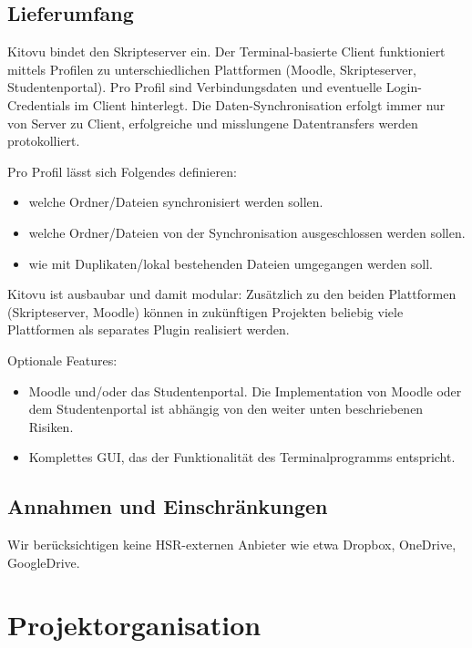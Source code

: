 \documentclass[a4paper]{article}
\begin{document}
\subsection{Lieferumfang}
Kitovu bindet den Skripteserver ein. Der Terminal-basierte Client funktioniert mittels Profilen zu unterschiedlichen Plattformen (Moodle, Skripteserver, Studentenportal). Pro Profil sind Verbindungsdaten und eventuelle Login-Credentials im Client hinterlegt. Die Daten-Synchronisation erfolgt immer nur von Server zu Client, erfolgreiche und misslungene Datentransfers werden protokolliert.

Pro Profil lässt sich Folgendes definieren:

\begin{itemize}
\item welche Ordner/Dateien synchronisiert werden sollen.
\item welche Ordner/Dateien von der Synchronisation ausgeschlossen werden sollen.
\item wie mit Duplikaten/lokal bestehenden Dateien umgegangen werden soll.
\end{itemize}

Kitovu ist ausbaubar und damit modular: Zusätzlich zu den beiden Plattformen (Skripteserver, Moodle) können in zukünftigen Projekten beliebig viele Plattformen als separates Plugin realisiert werden.

Optionale Features:

\begin{itemize}
\item Moodle und/oder das Studentenportal. Die Implementation von Moodle oder dem Studentenportal ist abhängig von den weiter unten beschriebenen Risiken.
\item Komplettes GUI, das der Funktionalität des Terminalprogramms entspricht.
\end{itemize}

\subsection{Annahmen und Einschränkungen}
Wir berücksichtigen keine HSR-externen Anbieter wie etwa Dropbox, OneDrive, GoogleDrive.

\section{Projektorganisation}
\blindtext
\end{document}
